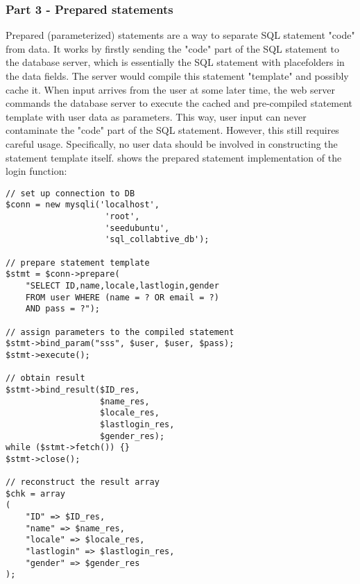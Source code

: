 \subsubsection{Part 3 - Prepared statements}
Prepared (parameterized) statements are a way to separate SQL statement "code" from data. It works by firstly sending the "code" part of the SQL statement to the database server, which is essentially the SQL statement with placefolders in the data fields. The server would compile this statement "template" and possibly cache it. When input arrives from the user at some later time, the web server commands the database server to execute the cached and pre-compiled statement template with user data as parameters. This way, user input can never contaminate the "code" part of the SQL statement. However, this still requires careful usage. Specifically, no user data should be involved in constructing the statement template itself.  shows the prepared statement implementation of the login function:

\begin{minipage}{\linewidth}
\begin{lstlisting}[caption={Prepared statement implementation of the login function},
label={lst:l4_t3p3_ps},
frame=single]
// set up connection to DB
$conn = new mysqli('localhost',
                    'root',
                    'seedubuntu',
                    'sql_collabtive_db');

// prepare statement template
$stmt = $conn->prepare(
    "SELECT ID,name,locale,lastlogin,gender
    FROM user WHERE (name = ? OR email = ?)
    AND pass = ?");

// assign parameters to the compiled statement
$stmt->bind_param("sss", $user, $user, $pass);
$stmt->execute();

// obtain result
$stmt->bind_result($ID_res,
                   $name_res,
                   $locale_res,
                   $lastlogin_res,
                   $gender_res);
while ($stmt->fetch()) {}
$stmt->close();

// reconstruct the result array
$chk = array
(
    "ID" => $ID_res,
    "name" => $name_res,
    "locale" => $locale_res,
    "lastlogin" => $lastlogin_res,
    "gender" => $gender_res
);
\end{lstlisting}
\end{minipage}